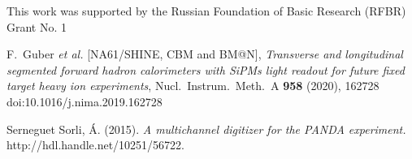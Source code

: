 \documentclass[a4paper,11pt]{article}
\begin{document}
\acknowledgments
This work was supported by the Russian Foundation of Basic Research (RFBR) Grant No. 1



\begin{thebibliography}{99}



F.~Guber \textit{et al.} [NA61/SHINE, CBM and BM@N],
\emph{Transverse and longitudinal segmented forward hadron calorimeters with SiPMs light readout for future fixed target heavy ion experiments},
Nucl.\ Instrum.\ Meth.\ A \textbf{958} (2020), 162728
doi:10.1016/j.nima.2019.162728


Serneguet Sorli, Á. (2015). \emph{A multichannel digitizer for the PANDA experiment.} http://hdl.handle.net/10251/56722.



\end{thebibliography}
\end{document}

